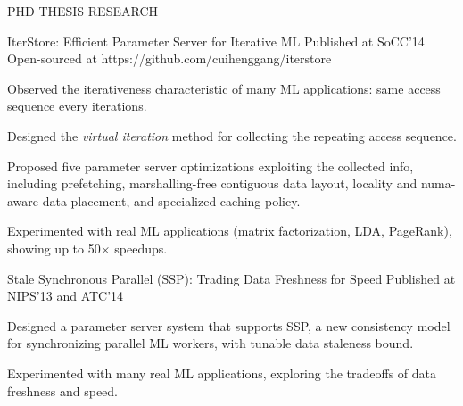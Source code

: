 \documentclass{resume} %
\begin{document}
\begin{rSection}{PHD THESIS RESEARCH}
\begin{rSubsection}{\hspace{-1em} IterStore: Efficient Parameter Server for Iterative ML}{}
{Published at SoCC'14\\
Open-sourced at https://github.com/cuihenggang/iterstore}{}
\vspace{-0.3em}
\item Observed the iterativeness characteristic of many ML applications: same access sequence every iterations.
\item Designed the \emph{virtual iteration} method for collecting the repeating access sequence.
\item Proposed five parameter server optimizations exploiting the collected info, including prefetching, marshalling-free contiguous data layout, locality and numa-aware data placement, and specialized caching policy.
\item Experimented with real ML applications (matrix factorization, LDA, PageRank), showing up to 50$\times$ speedups.
\end{rSubsection}
\vspace{-.1in}


\begin{rSubsection}{\hspace{-1em} Stale Synchronous Parallel (SSP): Trading Data Freshness for Speed}{}
{Published at NIPS'13 and ATC'14}{}
\vspace{-0.3em}
\item Designed a parameter server system that supports SSP, a new consistency model for synchronizing parallel ML workers, with tunable data staleness bound.
\item Experimented with many real ML applications, exploring the tradeoffs of data freshness and speed.
\end{rSubsection}
\vspace{-.1in}

\end{rSection}
\vspace{-.05in}
\end{document}

